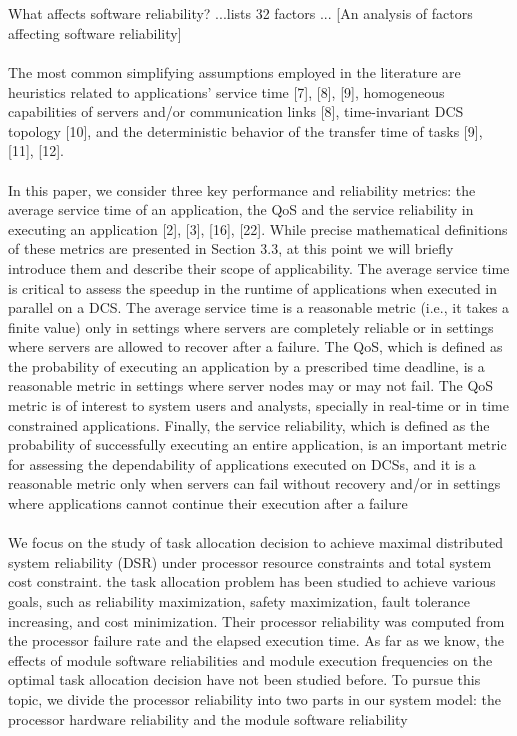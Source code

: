 \documentclass{cslthse-msc}
\begin{document}
\\\\
What affects software reliability? ...lists 32 factors ... [An analysis of factors affecting software reliability]
\\\\
The most common simplifying assumptions employed in the literature are heuristics related to applications’ service time [7], [8], [9], homogeneous capabilities of servers and/or communication links [8], time-invariant DCS topology [10], and the deterministic behavior of the transfer time of tasks [9], [11], [12]. \cite{perfRelNonMarkovian}
\\\\
In this paper, we consider three key performance and reliability metrics: the average service time of an application, the QoS and the service reliability in executing an application [2], [3], [16], [22]. While precise mathematical definitions of these metrics are presented in Section 3.3, at this point we will briefly introduce them and describe their scope of applicability. The average service time is critical to assess the speedup in the runtime of applications when executed in parallel on a DCS. The average service time is a reasonable metric (i.e., it takes a finite value) only in settings where servers are completely reliable or in settings where servers are allowed to recover after a failure. The QoS, which is defined as the probability of executing an application by a prescribed time deadline, is a reasonable metric in settings where server nodes may or may not fail. The QoS metric is of interest to system users and analysts, specially in real-time or in time constrained applications. Finally, the service reliability, which is defined as the probability of successfully executing an entire application, is an important metric for assessing the dependability of applications executed on DCSs, and it is a reasonable metric only when servers can fail without recovery and/or in settings where applications cannot continue their execution after a failure \cite{perfRelNonMarkovian}
\\\\
We focus on the study of task allocation decision to achieve maximal distributed system reliability (DSR) under processor resource constraints and total system cost constraint. the task allocation problem has been studied to achieve various goals, such as reliability maximization, safety maximization, fault tolerance increasing, and cost minimization. Their processor reliability was computed from the processor failure rate and the elapsed execution time. As far as we know, the effects of module software reliabilities and module execution frequencies on the optimal task allocation decision have not been studied before. To pursue this topic, we divide the processor reliability into two parts in our system model: the processor hardware reliability and the module software reliability \cite{decisionModelTaskAllocation}
\end{document}
